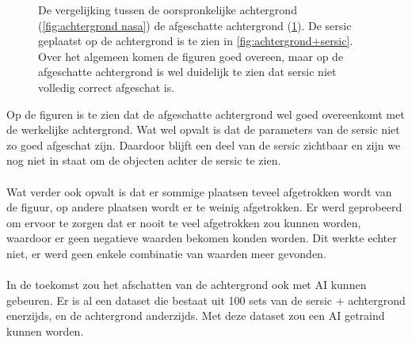 \begin{figure}
\begin{minipage}{0.98\linewidth}
        \label{fig:geschatte achtergrond}
    \end{minipage}
    \caption{De vergelijking tussen de oorspronkelijke achtergrond (\cref{fig:achtergrond nasa}) de afgeschatte achtergrond (\cref{fig:geschatte achtergrond}). De sersic geplaatst op de achtergrond is te zien in \cref{fig:achtergrond+sersic}. Over het algemeen komen de figuren goed overeen, maar op de afgeschatte achtergrond is wel duidelijk te zien dat sersic niet volledig correct afgeschat is.}
\end{figure}

Op de figuren is te zien dat de afgeschatte achtergrond wel goed overeenkomt met de werkelijke achtergrond. Wat wel opvalt is dat de parameters van de sersic niet zo goed afgeschat zijn. Daardoor blijft een deel van de sersic zichtbaar en zijn we nog niet in staat om de objecten achter de sersic te zien. \\ \\
Wat verder ook opvalt is dat er sommige plaatsen teveel afgetrokken wordt van de figuur, op andere plaatsen wordt er te weinig afgetrokken. Er werd geprobeerd om ervoor te zorgen dat er nooit te veel afgetrokken zou kunnen worden, waardoor er geen negatieve waarden bekomen konden worden. Dit werkte echter niet, er werd geen enkele combinatie van waarden meer gevonden. \\ \\
In de toekomst zou het afschatten van de achtergrond ook met AI kunnen gebeuren. Er is al een dataset die bestaat uit 100 sets van de sersic + achtergrond enerzijds, en de achtergrond anderzijds. Met deze dataset zou een AI getraind kunnen worden.










